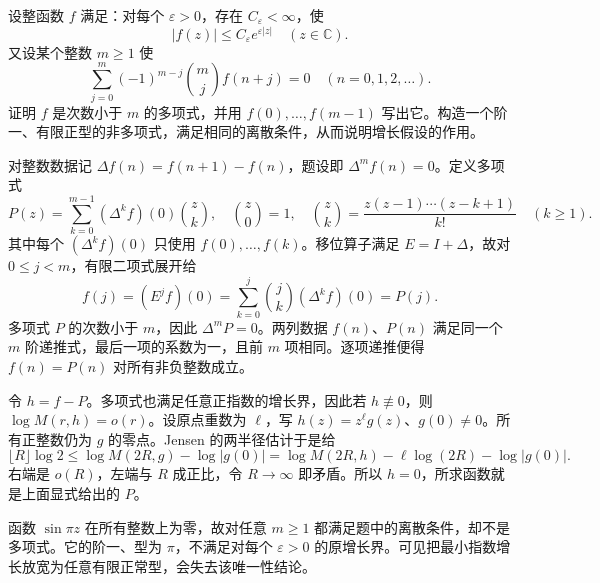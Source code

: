 \begin{exercise}[整数数据与多项式唯一性]\label{b3:ex:19-draft-04}
设整函数 \(f\) 满足：对每个 \(\varepsilon>0\)，存在 \(C_\varepsilon<\infty\)，使
\[
 |f(z)|\le C_\varepsilon e^{\varepsilon|z|}\quad(z\in\mathbb C).
\]
又设某个整数 \(m\ge1\) 使
\[
 \sum_{j=0}^m(-1)^{m-j}\binom mj f(n+j)=0
 \quad(n=0,1,2,\ldots).
\]
证明 \(f\) 是次数小于 \(m\) 的多项式，并用 \(f(0),\ldots,f(m-1)\) 写出它。构造一个阶一、有限正型的非多项式，满足相同的离散条件，从而说明增长假设的作用。
\end{exercise}
\begin{solution}
对整数数据记 \(\Delta f(n)=f(n+1)-f(n)\)，题设即 \(\Delta^mf(n)=0\)。定义多项式
\[
 P(z)=\sum_{k=0}^{m-1}(\Delta^kf)(0)\binom zk,
 \quad
 \binom z0=1,\quad
 \binom zk=\frac{z(z-1)\cdots(z-k+1)}{k!}\quad(k\ge1).
\]
其中每个 \((\Delta^kf)(0)\) 只使用 \(f(0),\ldots,f(k)\)。移位算子满足 \(E=I+\Delta\)，故对 \(0\le j<m\)，有限二项式展开给
\[
 f(j)=(E^jf)(0)=\sum_{k=0}^j\binom jk(\Delta^kf)(0)=P(j).
\]
多项式 \(P\) 的次数小于 \(m\)，因此 \(\Delta^mP=0\)。两列数据 \(f(n)\)、\(P(n)\) 满足同一个 \(m\) 阶递推式，最后一项的系数为一，且前 \(m\) 项相同。逐项递推便得 \(f(n)=P(n)\) 对所有非负整数成立。

令 \(h=f-P\)。多项式也满足任意正指数的增长界，因此若 \(h\not\equiv0\)，则
\(\log M(r,h)=o(r)\)。设原点重数为 \(\ell\)，写 \(h(z)=z^\ell g(z)\)、\(g(0)\ne0\)。所有正整数仍为 \(g\) 的零点。Jensen 的两半径估计于是给
\[
 \lfloor R\rfloor\log2
 \le\log M(2R,g)-\log|g(0)|
 =\log M(2R,h)-\ell\log(2R)-\log|g(0)|.
\]
右端是 \(o(R)\)，左端与 \(R\) 成正比，令 \(R\to\infty\) 即矛盾。所以 \(h=0\)，所求函数就是上面显式给出的 \(P\)。

函数 \(\sin\pi z\) 在所有整数上为零，故对任意 \(m\ge1\) 都满足题中的离散条件，却不是多项式。它的阶一、型为 \(\pi\)，不满足对每个 \(\varepsilon>0\) 的原增长界。可见把最小指数增长放宽为任意有限正常型，会失去该唯一性结论。
\end{solution}

